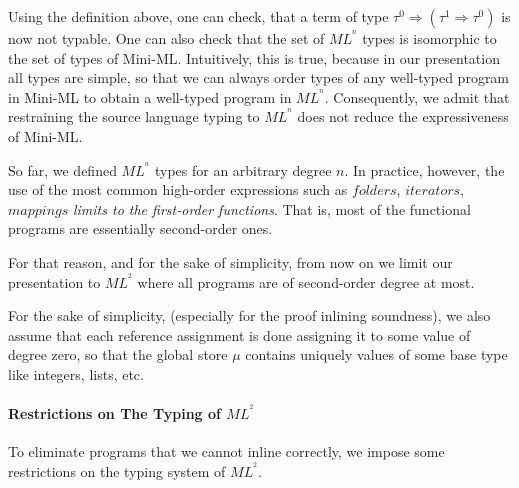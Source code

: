 \documentclass[a4paper,11pt,oneside]{article}
\theoremstyle{plain}
\newcommand{\inlsrc}{\textit{ML}^{^2}}
\begin{document}
	Using the definition above, one can check, that a term of type $\tau^{0} \Rightarrow (\tau^{1} \Rightarrow \tau^{0})$ is now not typable.
	One can also check that the set of $ML^{^{n}}$ types is isomorphic to the set of types of Mini-ML.
Intuitively, this is true, because in our presentation all types are simple, so that we can always order types of any well-typed program in Mini-ML to obtain a well-typed program in $ML^{^{n}}$. 
	Consequently, we admit that restraining the source language typing to $ML^{^{n}}$ does not reduce the expressiveness of Mini-ML.

	

%



So far, we defined $ML^{^{n}}$ types for an arbitrary degree $n$. 
In practice, however, the use of the most common high-order expressions such as $folders$, $iterators$, $mappings$ \textit{limits  to the first-order functions}.
That is, most of the functional programs are essentially second-order ones. 

For that reason, and for the sake of simplicity, from now on we limit our presentation to $ML^{^{2}}$ where all programs are of second-order degree at most.

For the sake of simplicity, (especially for the proof inlining soundness), we also assume that each reference assignment is done assigning it to some value of degree zero, so that the global store $\mu$ contains uniquely values of some base type like integers, lists, etc.

\paragraph{Restrictions on The Typing of \texorpdfstring{$ML^{^{2}}$}{}}

	To eliminate programs that we cannot inline correctly, we impose some restrictions on the typing system of $\inlsrc$.
 
\end{document}
